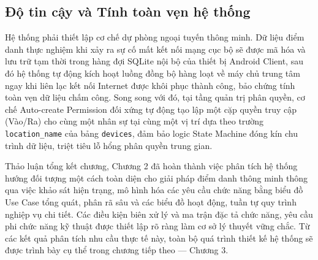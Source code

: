 ﻿\documentclass[../DoAn.tex]{subfiles}
\begin{document}
\subsection{Độ tin cậy và Tính toàn vẹn hệ thống}
Hệ thống phải thiết lập cơ chế dự phòng ngoại tuyến thông minh. Dữ liệu điểm danh thực nghiệm khi xảy ra sự cố mất kết nối mạng cục bộ sẽ được mã hóa và lưu trữ tạm thời trong hàng đợi SQLite nội bộ của thiết bị Android Client, sau đó hệ thống tự động kích hoạt luồng đồng bộ hàng loạt về máy chủ trung tâm ngay khi liên lạc kết nối Internet được khôi phục thành công, bảo chứng tính toàn vẹn dữ liệu chấm công. Song song với đó, tại tầng quản trị phân quyền, cơ chế Auto-create Permission đối xứng tự động tạo lập một cặp quyền truy cập (Vào/Ra) cho cùng một nhân sự tại cùng một vị trí dựa theo trường \texttt{location\_name} của bảng \texttt{devices}, đảm bảo logic State Machine đóng kín chu trình dữ liệu, triệt tiêu lỗ hổng phân quyền trung gian.

Thảo luận tổng kết chương, Chương 2 đã hoàn thành việc phân tích hệ thống hướng đối tượng một cách toàn diện cho giải pháp điểm danh thông minh thông qua việc khảo sát hiện trạng, mô hình hóa các yêu cầu chức năng bằng biểu đồ Use Case tổng quát, phân rã sâu và các biểu đồ hoạt động, tuần tự quy trình nghiệp vụ chi tiết. Các điều kiện biên xử lý và ma trận đặc tả chức năng, yêu cầu phi chức năng kỹ thuật được thiết lập rõ ràng làm cơ sở lý thuyết vững chắc. Từ các kết quả phân tích nhu cầu thực tế này, toàn bộ quá trình thiết kế hệ thống sẽ được trình bày cụ thể trong chương tiếp theo — Chương 3.
\end{document}
